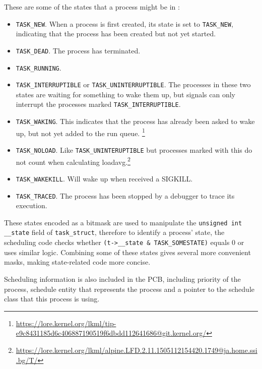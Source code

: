 \documentclass[11pt]{article}
\begin{document}
These are some of the states that a process might be in :
\begin{itemize}
	\item \lstinline{TASK_NEW}.
	      When a process is first created, its state is set to \lstinline{TASK_NEW}, indicating that the process has been created but not yet started.
	\item \lstinline{TASK_DEAD}.
	      The process has terminated.
	\item \lstinline{TASK_RUNNING}.
	\item \lstinline{TASK_INTERRUPTIBLE} or \lstinline{TASK_UNINTERRUPTIBLE}.
	      The processes in these two states are waiting for something to wake them up, but signals can only interrupt the processes marked \lstinline{TASK_INTERRUPTIBLE}.
	\item \lstinline{TASK_WAKING}.
	      This indicates that the process has already been asked to wake up, but not yet added to the run queue. \footnote{\url{https://lore.kernel.org/lkml/tip-e9c8431185d6c406887190519f6dbdd112641686@git.kernel.org/}}
	\item \lstinline{TASK_NOLOAD}.
	      Like \lstinline{TASK_UNINTERUPTIBLE} but processes marked with this do not count when calculating loadavg.\footnote{\url{https://lore.kernel.org/lkml/alpine.LFD.2.11.1505112154420.1749@ja.home.ssi.bg/T/}}
	\item \lstinline{TASK_WAKEKILL}.
	      Will wake up when received a SIGKILL.
	\item \lstinline{TASK_TRACED}.
	      The process has been stopped by a debugger to trace its execution.
\end{itemize}
These states encoded as a bitmask are used to manipulate the \lstinline{unsigned int __state} field of \lstinline{task_struct}, therefore to identify a process' state, the scheduling code checks whether \lstinline{(t->__state & TASK_SOMESTATE)} equals 0 or uses similar logic.
Combining some of these states gives several more convenient masks, making state-related code more concise.

Scheduling information is also included in the PCB, including priority of the process, schedule entity that represents the process and a pointer to the schedule class that this process is using.

\printbibliography[heading=bibintoc]

\newpage
\end{document}
